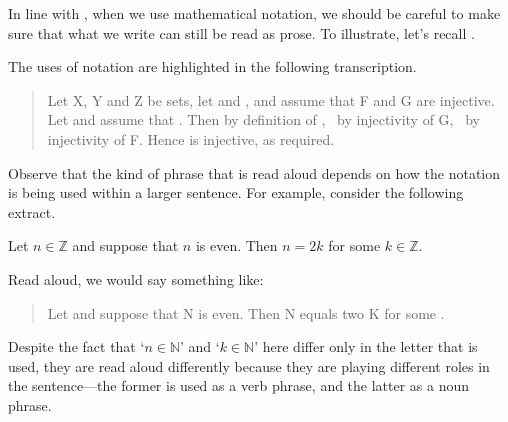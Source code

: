 In line with , when we use mathematical notation, we should be careful to make sure that what we write can still be read as prose. To illustrate, let's recall .


The uses of notation are highlighted in the following transcription.

\begin{quote}
Let X, Y and Z be sets, let  and  , and assume that F and G are injective. Let   and assume that . Then   by definition of ,  \,  by injectivity of G,  \,  by injectivity of F. Hence  is injective, as required.
\end{quote}

Observe that the kind of phrase that is read aloud depends on how the notation is being used within a larger sentence. For example, consider the following extract.

\begin{extract}
Let $n \in \mathbb{Z}$ and suppose that $n$ is even. Then $n=2k$ for some $k \in \mathbb{Z}$.
\end{extract}

Read aloud, we would say something like:
\begin{quote}
Let  and suppose that N is even. Then N equals two K for some .
\end{quote}
Despite the fact that `$n \in \mathbb{N}$' and `$k \in \mathbb{N}$' here differ only in the letter that is used, they are read aloud differently because they are playing different roles in the sentence---the former is used as a verb phrase, and the latter as a noun phrase.

